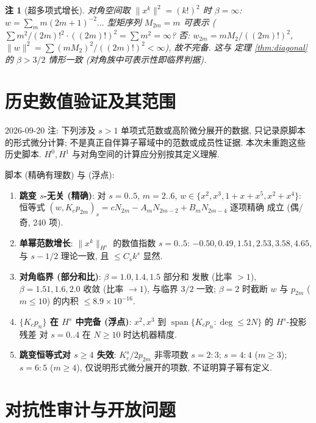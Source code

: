\documentclass[UTF8]{ctexart}
\newtheorem{remark}[theorem]{注}
\begin{document}
\begin{remark}[超多项式增长]
	对角空间取 $\|x^k\|^2 = (k!)^2$ 时 $\beta = \infty$: $w = \sum_m
	m(2m+1)^{-2}...$ 型矩序列 $M_{2m} = m$ 可表示 ($\sum m^2/(2m)!^2
	\cdot ((2m)!)^2 = \sum m^2 = \infty$? 否: $w_{2m} = mM_2/((2m)!)^2$,
	$\|w\|^2 = \sum (mM_2)^2/((2m)!)^2 < \infty$), 故不完备. 这与
	定理 \ref{thm:diagonal} 的 $\beta > 3/2$ 情形一致 (对角族中可表示性即临界判据).
\end{remark}

\section{历史数值验证及其范围}
2026-09-20 注: 下列涉及 $s>1$ 单项式范数或高阶微分展开的数据,
只记录原脚本的形式微分计算; 不是真正自伴算子幂域中的范数或成员性证据.
本次未重跑这些历史脚本. $H^0,H^1$ 与对角空间的计算应分别按其定义理解.


脚本  (精确有理数) 与
 (浮点):
\begin{enumerate}
	\item \textbf{跳变 $s$-无关 (精确)}: 对 $s = 0..5$, $m = 2..6$,
		$w \in \{x^2, x^3, 1+x+x^5, x^2+x^4\}$: 恒等式
		$(w, K_c p_{2m})_s = cN_{2m} - A_mN_{2m-2} + B_mN_{2m-4}$ 逐项精确
		成立 (偶/奇, 240 项).
	\item \textbf{单幂范数增长}: $\|x^k\|_{H^s}$ 的数值指数 $s = 0..5$:
		$-0.50, 0.49, 1.51, 2.53, 3.58, 4.65$, 与 $s - 1/2$ 理论一致,
		且 $\leq C_s k^s$ 显然.
	\item \textbf{对角临界 (部分和比)}: $\beta = 1.0, 1.4, 1.5$ 部分和
		发散 (比率 $> 1$), $\beta = 1.51, 1.6, 2.0$ 收敛 (比率 $\to 1$),
		与临界 $3/2$ 一致; $\beta = 2$ 时截断 $w$ 与 $p_{2m}$
		($m \leq 10$) 的内积 $\leq 8.9\times10^{-16}$.
	\item \textbf{$\{K_c p_n\}$ 在 $H^s$ 中完备 (浮点)}: $x^2, x^3$ 到
		$\operatorname{span}\{K_c p_n : \deg \leq 2N\}$ 的 $H^s$-投影残差
		对 $s = 0..4$ 在 $N \geq 10$ 时达机器精度.
	\item \textbf{跳变恒等式对 $s \geq 4$ 失效}: $K_c^s/2 p_{2m}$ 非零项数
		$s=2: 3$; $s=4: 4$ ($m \geq 3$); $s=6: 5$ ($m \geq 4$),
		仅说明形式微分展开的项数, 不证明算子幂有定义.
\end{enumerate}

\section{对抗性审计与开放问题}
\end{document}
